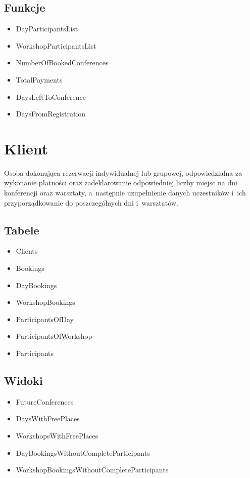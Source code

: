 \documentclass[12pt, a4paper]{mwrep}
\begin{document}
\subsection{Funkcje}

\begin{itemize}
  \item DayParticipantsList
  \item WorkshopParticipantsList
  \item NumberOfBookedConferences
  \item TotalPayments
  \item DaysLeftToConference
  \item DaysFromRegistration
\end{itemize}

\section{Klient}

Osoba dokonująca rezerwacji indywidualnej lub grupowej, odpowiedzialna za wykonanie płatności oraz zadeklarowanie odpowiedniej liczby miejsc na dni konferencji oraz warsztaty, a~następnie uzupełnienie danych uczestników i~ich przyporządkowanie do poszczególnych dni i~warsztatów.

\subsection{Tabele}

\begin{itemize}
  \item Clients
  \item Bookings
  \item DayBookings
  \item WorkshopBookings
  \item ParticipantsOfDay
  \item ParticipantsOfWorkshop
  \item Participants
\end{itemize}

\subsection{Widoki}

\begin{itemize}
  \item FutureConferences
  \item DaysWithFreePlaces
  \item WorkshopsWithFreePlaces
  \item DayBookingsWithoutCompleteParticipants
  \item WorkshopBookingsWithoutCompleteParticipants
\end{itemize}
\end{document}
